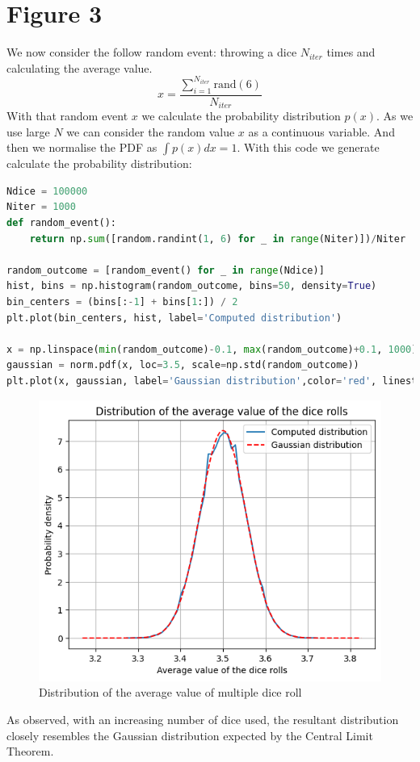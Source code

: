 \documentclass{article}
\begin{document}
\section{Figure 3}
We now consider the follow random event: throwing a dice $N_{iter}$ times and calculating the average value.
\begin{equation}
    x=\frac{\sum_{i=1}^{N_{iter}}{\text{rand}(6)}}{N_{iter}}
\end{equation}
With that random event $x$ we calculate the probability distribution $p(x)$. As we use large $N$ we can consider the random value $x$ as a continuous variable. And then we normalise the PDF as $\int{p(x)dx}=1$.
With this code we generate calculate the probability distribution:
\begin{lstlisting}[language=Python]
Ndice = 100000
Niter = 1000
def random_event():
    return np.sum([random.randint(1, 6) for _ in range(Niter)])/Niter

random_outcome = [random_event() for _ in range(Ndice)]
hist, bins = np.histogram(random_outcome, bins=50, density=True)
bin_centers = (bins[:-1] + bins[1:]) / 2
plt.plot(bin_centers, hist, label='Computed distribution')

x = np.linspace(min(random_outcome)-0.1, max(random_outcome)+0.1, 1000)
gaussian = norm.pdf(x, loc=3.5, scale=np.std(random_outcome))
plt.plot(x, gaussian, label='Gaussian distribution',color='red', linestyle='--')
\end{lstlisting}
\begin{figure}[H]
    \centering
    \includegraphics[width=.9\linewidth]{images/Figure3.png}
    \caption{Distribution of the average value of multiple dice roll}
    \label{fig:3}
\end{figure}
As observed, with an increasing number of dice used, the resultant distribution closely resembles the Gaussian distribution expected by the Central Limit Theorem. 
\clearpage
\end{document}
